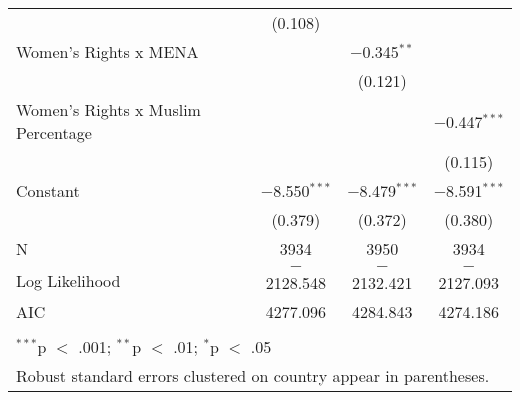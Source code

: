 \begin{table}[!htbp]
\begin{tabular}{@{\extracolsep{5pt}}lccc}
  & (0.108) &  &  \\ 
  Women's Rights x MENA &  & $-$0.345$^{**}$ &  \\ 
  &  & (0.121) &  \\ 
  Women's Rights x Muslim Percentage &  &  & $-$0.447$^{***}$ \\ 
  &  &  & (0.115) \\ 
  Constant & $-$8.550$^{***}$ & $-$8.479$^{***}$ & $-$8.591$^{***}$ \\ 
  & (0.379) & (0.372) & (0.380) \\ 
 N & 3934 & 3950 & 3934 \\ 
Log Likelihood & $-$2128.548 & $-$2132.421 & $-$2127.093 \\ 
AIC & 4277.096 & 4284.843 & 4274.186 \\ 
\hline \\[-1.8ex] 
\multicolumn{4}{l}{$^{***}$p $<$ .001; $^{**}$p $<$ .01; $^{*}$p $<$ .05} \\ 
\multicolumn{4}{l}{Robust standard errors clustered on country appear in parentheses.} \\ 
\end{tabular} 
\end{table} 

